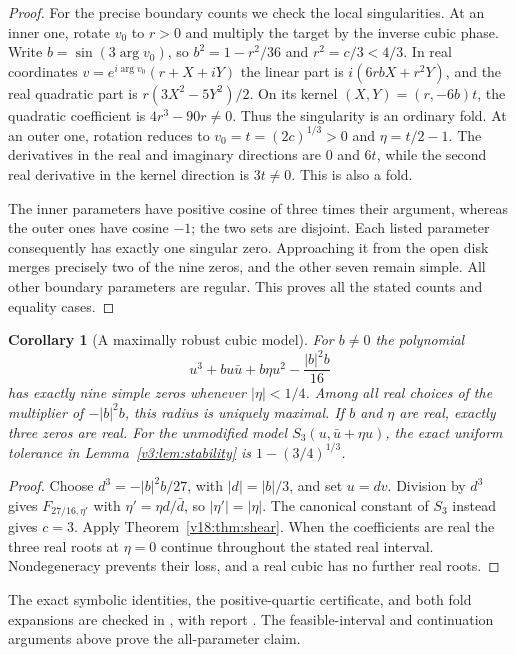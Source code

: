 \documentclass[UTF8,11pt]{ctexart}
\newtheorem{cor}[thm]{Corollary}
\theoremstyle{definition}
\numberwithin{equation}{section}
\begin{document}
\begin{proof}
For the precise boundary counts we check the local singularities.
At an inner one, rotate $v_0$ to $r>0$ and multiply the target
by the inverse cubic phase. Write $b=\sin(3\arg v_0)$, so
$b^2=1-r^2/36$ and $r^2=c/3<4/3$. In real coordinates
$v=e^{i\arg v_0}(r+X+iY)$ the linear part is
$i(6rbX+r^2Y)$, and the real quadratic part is
$r(3X^2-5Y^2)/2$. On its kernel $(X,Y)=(r,-6b)t$,
the quadratic coefficient is $4r^3-90r\ne0$.
Thus the singularity is an ordinary fold. At an outer one,
rotation reduces to $v_0=t=(2c)^{1/3}>0$ and
$\eta=t/2-1$. The derivatives in the real and imaginary
directions are $0$ and $6t$, while the second real derivative
in the kernel direction is $3t\ne0$. This is also a fold.

The inner parameters have positive cosine of three times their
argument, whereas the outer ones have cosine $-1$; the two sets
are disjoint. Each listed parameter consequently has exactly one
singular zero. Approaching it from the open disk merges precisely
two of the nine zeros, and the other seven remain simple.
All other boundary parameters are regular. This proves all the
stated counts and equality cases.
\end{proof}

\begin{cor}[A maximally robust cubic model]\label{v18:cor:model}
For $b\ne0$ the polynomial
\[
 u^3+bu\bar u+b\eta u^2-\frac{|b|^2b}{16}
\]
has exactly nine simple zeros whenever $|\eta|<1/4$.
Among all real choices of the multiplier of $-|b|^2b$, this
radius is uniquely maximal. If $b$ and $\eta$ are real,
exactly three zeros are real. For the unmodified model
$S_3(u,\bar u+\eta u)$, the exact uniform tolerance in
Lemma~\ref{v3:lem:stability} is $1-(3/4)^{1/3}$.
\end{cor}
\begin{proof}
Choose $d^3=-|b|^2b/27$, with $|d|=|b|/3$, and set $u=dv$.
Division by $d^3$ gives $F_{27/16,\eta'}$ with
$\eta'=\eta d/\bar d$, so $|\eta'|=|\eta|$.
The canonical constant of $S_3$ instead gives $c=3$.
Apply Theorem~\ref{v18:thm:shear}. When the coefficients are
real the three real roots at $\eta=0$ continue throughout
the stated real interval. Nondegeneracy prevents their loss,
and a real cubic has no further real roots.
\end{proof}

The exact symbolic identities, the positive-quartic certificate,
and both fold expansions are checked in
, with report
. The feasible-interval
and continuation arguments above prove the all-parameter claim.
\end{document}
